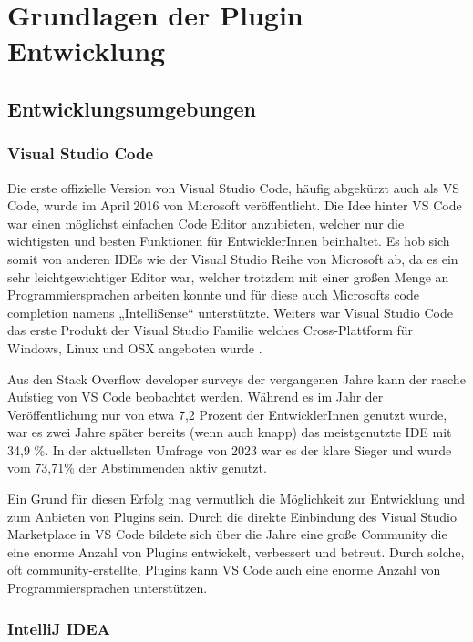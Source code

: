 \chapter{Grundlagen der Plugin Entwicklung}
\label{cha:Grundlagen}

\section{Entwicklungsumgebungen}
\label{sec:Entwicklungsumgebungen}

\subsection{Visual Studio Code}

Die erste offizielle Version von Visual Studio Code, häufig 
abgekürzt auch als VS Code, wurde im April 2016 \cite{VSCodeReleaseDate}
von Microsoft veröffentlicht. Die Idee hinter VS Code
war einen möglichst einfachen Code Editor anzubieten, 
welcher nur die wichtigsten und besten Funktionen für EntwicklerInnen 
beinhaltet. Es hob sich somit von anderen IDEs wie der Visual Studio 
Reihe von Microsoft ab, da es ein sehr leichtgewichtiger Editor war, 
welcher trotzdem mit einer großen Menge an Programmiersprachen arbeiten 
konnte und für diese auch Microsofts code completion namens „IntelliSense“ 
unterstützte. Weiters war Visual Studio Code das erste Produkt der Visual 
Studio Familie welches Cross-Plattform für Windows, Linux und OSX 
angeboten wurde \cite{VSCodePreview}.

Aus den Stack Overflow developer surveys der vergangenen Jahre kann 
der rasche Aufstieg von VS Code beobachtet werden. Während es im 
Jahr der Veröffentlichung nur von etwa 7,2 Prozent der EntwicklerInnen 
genutzt wurde, war es zwei Jahre später bereits (wenn auch knapp) 
das meistgenutzte IDE mit 34,9 \%. In der aktuellsten Umfrage von 
2023 war es der klare Sieger und wurde vom 73,71\% der Abstimmenden 
aktiv genutzt\cite{StackOverflowSurvey,StackOverflowSurvey2023}.

Ein Grund für diesen Erfolg mag vermutlich die Möglichkeit 
zur Entwicklung und zum Anbieten von Plugins sein. Durch die direkte 
Einbindung des Visual Studio Marketplace in VS Code bildete sich über die 
Jahre eine große Community die eine enorme Anzahl von Plugins 
entwickelt, verbessert und betreut. Durch solche, oft 
community-erstellte, Plugins kann VS Code auch eine enorme Anzahl von
Programmiersprachen unterstützen.


\subsection{IntelliJ IDEA}

